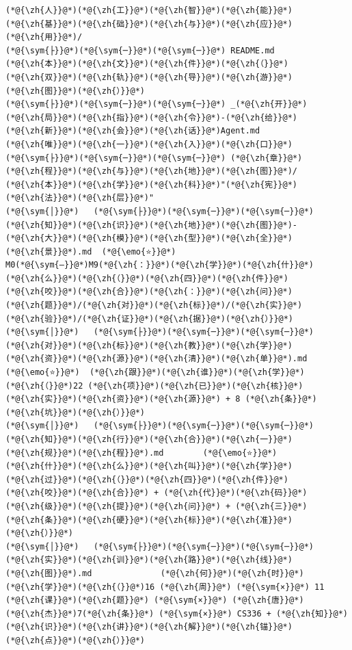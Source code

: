 \documentclass[
]{article}
\def\zh#1{{\zhfont #1}}
\def\sym#1{{\symfont #1}}
\def\emo#1{{\emofont #1}}
\begin{document}
\begin{lstlisting}
(*@{\zh{人}}@*)(*@{\zh{工}}@*)(*@{\zh{智}}@*)(*@{\zh{能}}@*)(*@{\zh{基}}@*)(*@{\zh{础}}@*)(*@{\zh{与}}@*)(*@{\zh{应}}@*)(*@{\zh{用}}@*)/
(*@{\sym{├}}@*)(*@{\sym{─}}@*)(*@{\sym{─}}@*) README.md                    (*@{\zh{本}}@*)(*@{\zh{文}}@*)(*@{\zh{件}}@*)(*@{\zh{（}}@*)(*@{\zh{双}}@*)(*@{\zh{轨}}@*)(*@{\zh{导}}@*)(*@{\zh{游}}@*)(*@{\zh{图}}@*)(*@{\zh{）}}@*)
(*@{\sym{├}}@*)(*@{\sym{─}}@*)(*@{\sym{─}}@*) _(*@{\zh{开}}@*)(*@{\zh{局}}@*)(*@{\zh{指}}@*)(*@{\zh{令}}@*)-(*@{\zh{给}}@*)(*@{\zh{新}}@*)(*@{\zh{会}}@*)(*@{\zh{话}}@*)Agent.md     (*@{\zh{唯}}@*)(*@{\zh{一}}@*)(*@{\zh{入}}@*)(*@{\zh{口}}@*)
(*@{\sym{├}}@*)(*@{\sym{─}}@*)(*@{\sym{─}}@*) (*@{\zh{章}}@*)(*@{\zh{程}}@*)(*@{\zh{与}}@*)(*@{\zh{地}}@*)(*@{\zh{图}}@*)/                   (*@{\zh{本}}@*)(*@{\zh{学}}@*)(*@{\zh{科}}@*)"(*@{\zh{宪}}@*)(*@{\zh{法}}@*)(*@{\zh{层}}@*)"
(*@{\sym{│}}@*)   (*@{\sym{├}}@*)(*@{\sym{─}}@*)(*@{\sym{─}}@*) (*@{\zh{知}}@*)(*@{\zh{识}}@*)(*@{\zh{地}}@*)(*@{\zh{图}}@*)-(*@{\zh{大}}@*)(*@{\zh{模}}@*)(*@{\zh{型}}@*)(*@{\zh{全}}@*)(*@{\zh{景}}@*).md  (*@{\emo{⭐}}@*)  M0(*@{\sym{–}}@*)M9(*@{\zh{：}}@*)(*@{\zh{学}}@*)(*@{\zh{什}}@*)(*@{\zh{么}}@*)(*@{\zh{（}}@*)(*@{\zh{四}}@*)(*@{\zh{件}}@*)(*@{\zh{咬}}@*)(*@{\zh{合}}@*)(*@{\zh{：}}@*)(*@{\zh{问}}@*)(*@{\zh{题}}@*)/(*@{\zh{对}}@*)(*@{\zh{标}}@*)/(*@{\zh{实}}@*)(*@{\zh{验}}@*)/(*@{\zh{证}}@*)(*@{\zh{据}}@*)(*@{\zh{）}}@*)
(*@{\sym{│}}@*)   (*@{\sym{├}}@*)(*@{\sym{─}}@*)(*@{\sym{─}}@*) (*@{\zh{对}}@*)(*@{\zh{标}}@*)(*@{\zh{教}}@*)(*@{\zh{学}}@*)(*@{\zh{资}}@*)(*@{\zh{源}}@*)(*@{\zh{清}}@*)(*@{\zh{单}}@*).md    (*@{\emo{⭐}}@*)  (*@{\zh{跟}}@*)(*@{\zh{谁}}@*)(*@{\zh{学}}@*)(*@{\zh{（}}@*)22 (*@{\zh{项}}@*)(*@{\zh{已}}@*)(*@{\zh{核}}@*)(*@{\zh{实}}@*)(*@{\zh{资}}@*)(*@{\zh{源}}@*) + 8 (*@{\zh{条}}@*)(*@{\zh{坑}}@*)(*@{\zh{）}}@*)
(*@{\sym{│}}@*)   (*@{\sym{├}}@*)(*@{\sym{─}}@*)(*@{\sym{─}}@*) (*@{\zh{知}}@*)(*@{\zh{行}}@*)(*@{\zh{合}}@*)(*@{\zh{一}}@*)(*@{\zh{规}}@*)(*@{\zh{程}}@*).md        (*@{\emo{⭐}}@*)  (*@{\zh{什}}@*)(*@{\zh{么}}@*)(*@{\zh{叫}}@*)(*@{\zh{学}}@*)(*@{\zh{过}}@*)(*@{\zh{（}}@*)(*@{\zh{四}}@*)(*@{\zh{件}}@*)(*@{\zh{咬}}@*)(*@{\zh{合}}@*) + (*@{\zh{代}}@*)(*@{\zh{码}}@*)(*@{\zh{级}}@*)(*@{\zh{提}}@*)(*@{\zh{问}}@*) + (*@{\zh{三}}@*)(*@{\zh{条}}@*)(*@{\zh{硬}}@*)(*@{\zh{标}}@*)(*@{\zh{准}}@*)(*@{\zh{）}}@*)
(*@{\sym{│}}@*)   (*@{\sym{├}}@*)(*@{\sym{─}}@*)(*@{\sym{─}}@*) (*@{\zh{实}}@*)(*@{\zh{训}}@*)(*@{\zh{路}}@*)(*@{\zh{线}}@*)(*@{\zh{图}}@*).md              (*@{\zh{何}}@*)(*@{\zh{时}}@*)(*@{\zh{学}}@*)(*@{\zh{（}}@*)16 (*@{\zh{周}}@*) (*@{\sym{×}}@*) 11 (*@{\zh{课}}@*)(*@{\zh{题}}@*) (*@{\sym{×}}@*) (*@{\zh{唐}}@*)(*@{\zh{杰}}@*)7(*@{\zh{条}}@*) (*@{\sym{×}}@*) CS336 + (*@{\zh{知}}@*)(*@{\zh{识}}@*)(*@{\zh{讲}}@*)(*@{\zh{解}}@*)(*@{\zh{锚}}@*)(*@{\zh{点}}@*)(*@{\zh{）}}@*)

\end{lstlisting}
\end{document}
